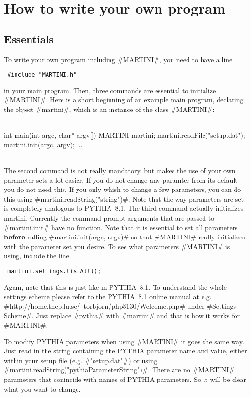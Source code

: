 \chapter{How to write your own program}
\label{usage}
\section{Essentials}
To write your own program including #MARTINI#, you need to have a line
\begin{verbatim} #include "MARTINI.h"\end{verbatim}
in your main program.
Then, three commands are essential to initialize #MARTINI#.
Here is a short beginning of an example main program, declaring the object #martini#,
which is an instance of the class #MARTINI#:\\
~\\
\begin{boxedverbatim}
int main(int argc, char* argv[]) 
{
  MARTINI martini;
  martini.readFile("setup.dat");
  martini.init(argc, argv);
  ...
}
\end{boxedverbatim}

~\\
The second command is not really mandatory, but 
makes the use of your own parameter sets a lot easier. If you do not change any paramter from its default
you do not need this. If you only whish to change a few parameters, you can do this using #martini.readString("string")#.
Note that the way parameters are set is completely analogous to PYTHIA~8.1. The third command actually initializes martini.
Currently the command prompt arguments that are passed to #martini.init# have no function.
Note that it is essential to set all parameters \textbf{before} calling #martini.init(argc, argv)# so that #MARTINI# really initializes
with the parameter set you desire.
To see what parameters #MARTINI# is using, include the line
\begin{verbatim} martini.settings.listAll(); \end{verbatim}
Again, note that this is just like in PYTHIA~8.1. To understand the whole settings scheme please refer to the PYTHIA~8.1 online
manual at e.g. #http://home.thep.lu.se/~torbjorn/php8130/Welcome.php# under #Settings Scheme#. 
Just replace #pythia# with #martini# and that is how it works for #MARTINI#.

To modify PYTHIA parameters when using #MARTINI# it goes the same way. Just read in the string containing the PYTHIA parameter
name and value, either within your setup file (e.g. #"setup.dat"#) or using #martini.readString("pythiaParameterString")#.
There are no #MARTINI# parameters that conincide with names of PYTHIA parameters. So it will be clear what you want to change.

